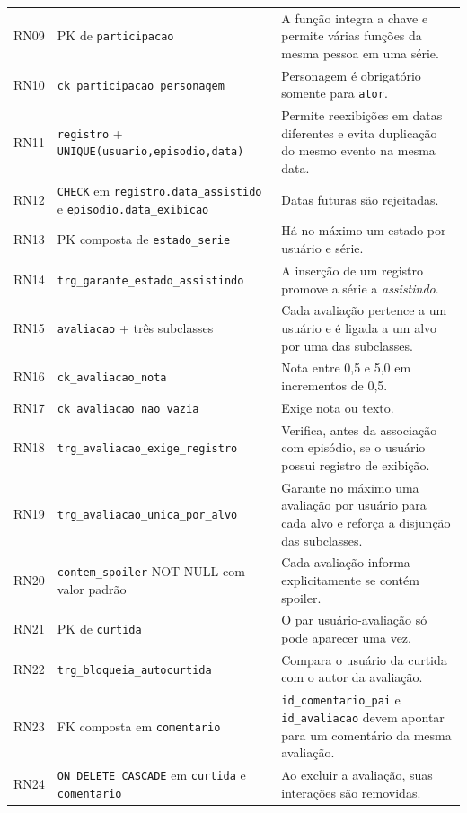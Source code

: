 \documentclass[a4paper,12pt,oneside,openany]{book}
\newif\iforientacoes
\newcommand{\id}[1]{\texttt{#1}}
\begin{document}
\begin{longtable}{@{}p{1.6cm}p{5.2cm}p{9cm}@{}}
RN09 & PK de \id{participacao} & A função integra a chave e permite várias funções da mesma pessoa em uma série. \\
RN10 & \id{ck\_participacao\_personagem} & Personagem é obrigatório somente para \id{ator}. \\
RN11 & \id{registro} + \id{UNIQUE(usuario,episodio,data)} & Permite reexibições em datas diferentes e evita duplicação do mesmo evento na mesma data. \\
RN12 & \id{CHECK} em \id{registro.data\_assistido} e \id{episodio.data\_exibicao} & Datas futuras são rejeitadas. \\
RN13 & PK composta de \id{estado\_serie} & Há no máximo um estado por usuário e série. \\
RN14 & \id{trg\_garante\_estado\_assistindo} & A inserção de um registro promove a série a \textit{assistindo}. \\
RN15 & \id{avaliacao} + três subclasses & Cada avaliação pertence a um usuário e é ligada a um alvo por uma das subclasses. \\
RN16 & \id{ck\_avaliacao\_nota} & Nota entre 0,5 e 5,0 em incrementos de 0,5. \\
RN17 & \id{ck\_avaliacao\_nao\_vazia} & Exige nota ou texto. \\
RN18 & \id{trg\_avaliacao\_exige\_registro} & Verifica, antes da associação com episódio, se o usuário possui registro de exibição. \\
RN19 & \id{trg\_avaliacao\_unica\_por\_alvo} & Garante no máximo uma avaliação por usuário para cada alvo e reforça a disjunção das subclasses. \\
RN20 & \id{contem\_spoiler} NOT NULL com valor padrão & Cada avaliação informa explicitamente se contém spoiler. \\
RN21 & PK de \id{curtida} & O par usuário-avaliação só pode aparecer uma vez. \\
RN22 & \id{trg\_bloqueia\_autocurtida} & Compara o usuário da curtida com o autor da avaliação. \\
RN23 & FK composta em \id{comentario} & \id{id\_comentario\_pai} e \id{id\_avaliacao} devem apontar para um comentário da mesma avaliação. \\
RN24 & \id{ON DELETE CASCADE} em \id{curtida} e \id{comentario} & Ao excluir a avaliação, suas interações são removidas. \\
\bottomrule
\end{longtable}


\iforientacoes
\appendix
\end{document}
